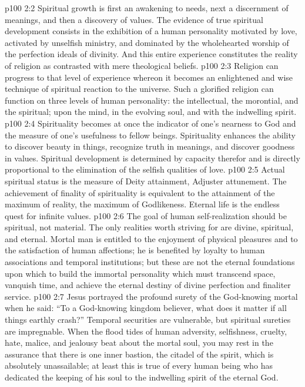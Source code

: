 \vs p100 2:2 Spiritual growth is first an awakening to needs, next a discernment of meanings, and then a discovery of values. The evidence of true spiritual development consists in the exhibition of a human personality motivated by love, activated by unselfish ministry, and dominated by the wholehearted worship of the perfection ideals of divinity. And this entire experience constitutes the reality of religion as contrasted with mere theological beliefs.
\vs p100 2:3 Religion can progress to that level of experience whereon it becomes an enlightened and wise technique of spiritual reaction to the universe. Such a glorified religion can function on three levels of human personality: the intellectual, the morontial, and the spiritual; upon the mind, in the evolving soul, and with the indwelling spirit.
\pc \vs p100 2:4 Spirituality becomes at once the indicator of one’s nearness to God and the measure of one’s usefulness to fellow beings. Spirituality enhances the ability to discover beauty in things, recognize truth in meanings, and discover goodness in values. Spiritual development is determined by capacity therefor and is directly proportional to the elimination of the selfish qualities of love.
\vs p100 2:5 Actual spiritual status is the measure of Deity attainment, Adjuster attunement. The achievement of finality of spirituality is equivalent to the attainment of the maximum of reality, the maximum of Godlikeness. Eternal life is the endless quest for infinite values.
\pc \vs p100 2:6 The goal of human self\hyp{}realization should be spiritual, not material. The only realities worth striving for are divine, spiritual, and eternal. Mortal man is entitled to the enjoyment of physical pleasures and to the satisfaction of human affections; he is benefited by loyalty to human associations and temporal institutions; but these are not the eternal foundations upon which to build the immortal personality which must transcend space, vanquish time, and achieve the eternal destiny of divine perfection and finaliter service.
\vs p100 2:7 Jesus portrayed the profound surety of the God\hyp{}knowing mortal when he said: \textcolor{ubdarkred}{“To a God\hyp{}knowing kingdom believer, what does it matter if all things earthly crash?”} Temporal securities are vulnerable, but spiritual sureties are impregnable. When the flood tides of human adversity, selfishness, cruelty, hate, malice, and jealousy beat about the mortal soul, you may rest in the assurance that there is one inner bastion, the citadel of the spirit, which is absolutely unassailable; at least this is true of every human being who has dedicated the keeping of his soul to the indwelling spirit of the eternal God.
